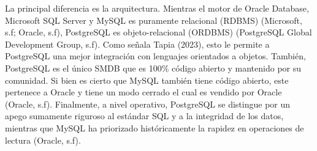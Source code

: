 La principal diferencia es la arquitectura. Mientras el motor de Oracle Database, Microsoft SQL Server y MySQL es puramente relacional (RDBMS) (Microsoft, s.f; Oracle, s.f), PostgreSQL es objeto-relacional (ORDBMS) (PostgreSQL Global Development Group, s.f). Como señala Tapia (2023), esto le permite a PostgreSQL una mejor integración con lenguajes orientados a objetos. También, PostgreSQL es el único SMDB que es 100\% código abierto y mantenido por su comunidad. Si bien es cierto que MySQL también tiene código abierto, este pertenece a Oracle y tiene un modo cerrado el cual es vendido por Oracle (Oracle, s.f). 
Finalmente, a nivel operativo, PostgreSQL se distingue por un apego sumamente riguroso al estándar SQL y a la integridad de los datos, mientras que MySQL ha priorizado históricamente la rapidez en operaciones de lectura (Oracle, s.f).
